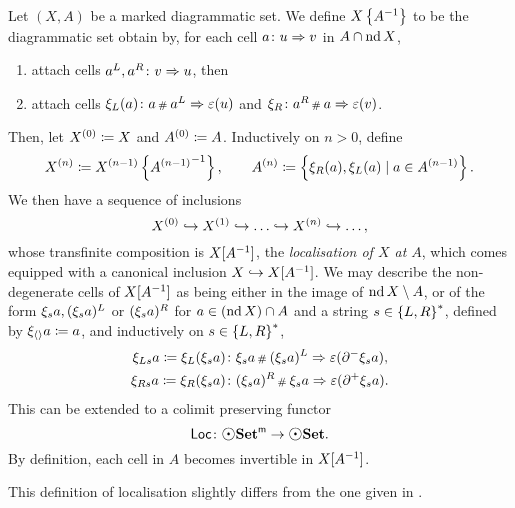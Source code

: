 \begin{dfn}
    Let \( (X, A) \) be a marked diagrammatic set.
    We define \( \preloc{X}{A} \) to be the diagrammatic set obtain by, for each cell \( a \colon u \celto v \) in \( A \cap \nd X \),
    \begin{enumerate}
        \item attach cells \( a^L, a^R  \colon v \celto u \), then
        \item attach cells \( \hinv{L}(a) \colon a \cp{} a^L \celto \un(u) \) and \( \hinv{R} \colon a^R \cp{} a \celto \un(v) \).
    \end{enumerate} 
    Then, let \( \order{0}{X} \eqdef X \) and \( \order{0}{A} \eqdef A \).
    Inductively on \( n > 0 \), define
    \begin{equation*}
        \order{n}{X} \eqdef \preloc{\order{n - 1}{X}}{\order{n - 1}{A}}, \quad\quad \order{n}{A} \eqdef \set{\hinv{R}(a), \hinv{L}(a) \mid a \in \order{n - 1}{A}}.
    \end{equation*}
    We then have a sequence of inclusions
    \begin{equation*}
        \order{0}{X} \incl \order{1}{X} \incl \ldots \incl \order{n}{X} \incl \ldots,
    \end{equation*}
    whose transfinite composition is \( \loc{X}{A} \), the \emph{localisation of \( X \) at \( A \)}, which comes equipped with a canonical inclusion \( X \incl \loc{X}{A} \).
    We may describe the non-degenerate cells of \( \loc{X}{A} \) as being either in the image of \( \nd X \setminus A \), or of the form \( \hinv{s}a, (\hinv{s}a)^L \) or \( (\hinv{s}a)^R \) for \( a \in (\nd X) \cap A \) and a string \( s \in \set{L, R}^* \), defined by \( \hinv{\langle\rangle} a \eqdef a \), and inductively on \( s \in \set{L, R}^* \),
    \begin{align*}
        \hinv{Ls}a \eqdef \hinv{L}(\hinv{s}a) &\colon \hinv{s}a \cp{} (\hinv{s}a)^L \celto \un(\bd{}{-}\hinv{s}a),\\
        \hinv{Rs}a \eqdef \hinv{R}(\hinv{s}a) &\colon (\hinv{s}a)^R \cp{} \hinv{s}a \celto \un(\bd{}{+}\hinv{s}a).
    \end{align*}
    This can be extended to a colimit preserving functor
    \begin{equation*}
        \Loc \colon \mdgmSet \to \dgmSet.
    \end{equation*}
    By definition, each cell in \( A \) becomes invertible in \( \loc{X}{A} \).
\end{dfn}

\begin{rmk}
    This definition of localisation slightly differs from the one given in \cite[2.38]{chanavat2024model}.
\end{rmk}

